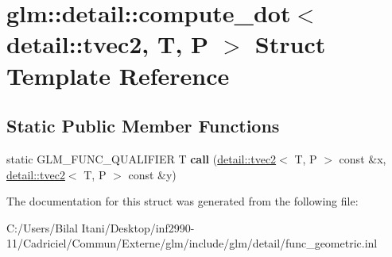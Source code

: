 \hypertarget{structglm_1_1detail_1_1compute__dot_3_01detail_1_1tvec2_00_01_t_00_01_p_01_4}{}\section{glm\+:\+:detail\+:\+:compute\+\_\+dot$<$ detail\+:\+:tvec2, T, P $>$ Struct Template Reference}
\label{structglm_1_1detail_1_1compute__dot_3_01detail_1_1tvec2_00_01_t_00_01_p_01_4}
\subsection*{Static Public Member Functions}
\begin{DoxyCompactItemize}
\item 
static G\+L\+M\+\_\+\+F\+U\+N\+C\+\_\+\+Q\+U\+A\+L\+I\+F\+I\+ER T {\bfseries call} (\hyperlink{structglm_1_1detail_1_1tvec2}{detail\+::tvec2}$<$ T, P $>$ const \&x, \hyperlink{structglm_1_1detail_1_1tvec2}{detail\+::tvec2}$<$ T, P $>$ const \&y)\hypertarget{structglm_1_1detail_1_1compute__dot_3_01detail_1_1tvec2_00_01_t_00_01_p_01_4_a5ab1761eaa0efc9ecb4f62171d2a6dd2}{}\label{structglm_1_1detail_1_1compute__dot_3_01detail_1_1tvec2_00_01_t_00_01_p_01_4_a5ab1761eaa0efc9ecb4f62171d2a6dd2}

\end{DoxyCompactItemize}


The documentation for this struct was generated from the following file\+:\begin{DoxyCompactItemize}
\item 
C\+:/\+Users/\+Bilal Itani/\+Desktop/inf2990-\/11/\+Cadriciel/\+Commun/\+Externe/glm/include/glm/detail/func\+\_\+geometric.\+inl\end{DoxyCompactItemize}
